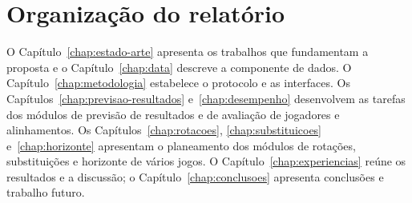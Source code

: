 \section{Organização do relatório}

O Capítulo~\ref{chap:estado-arte} apresenta os trabalhos que fundamentam
a proposta e o Capítulo~\ref{chap:data} descreve a componente de dados.
O Capítulo~\ref{chap:metodologia} estabelece o protocolo e as interfaces.
Os Capítulos~\ref{chap:previsao-resultados} e~\ref{chap:desempenho}
desenvolvem as tarefas dos módulos de previsão de resultados e de avaliação de jogadores e alinhamentos. Os
Capítulos~\ref{chap:rotacoes}, \ref{chap:substituicoes} e~\ref{chap:horizonte}
apresentam o planeamento dos módulos de rotações, substituições e horizonte de vários jogos. O
Capítulo~\ref{chap:experiencias} reúne os resultados e a discussão;
o Capítulo~\ref{chap:conclusoes} apresenta conclusões e trabalho futuro.
